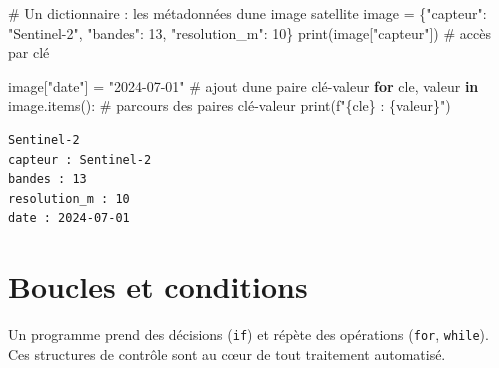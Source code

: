 \documentclass[
  french,
  11pt,
  letterpaper,
  open=any,
  twoside=false,
  french]{scrbook}
\newenvironment{Shaded}{\begin{snugshade}}{\end{snugshade}}
\newcommand{\BuiltInTok}[1]{\textcolor[rgb]{0.00,0.23,0.31}{#1}}
\newcommand{\CommentTok}[1]{\textcolor[rgb]{0.37,0.37,0.37}{#1}}
\newcommand{\ControlFlowTok}[1]{\textcolor[rgb]{0.00,0.23,0.31}{\textbf{#1}}}
\newcommand{\DecValTok}[1]{\textcolor[rgb]{0.68,0.00,0.00}{#1}}
\newcommand{\KeywordTok}[1]{\textcolor[rgb]{0.00,0.23,0.31}{\textbf{#1}}}
\newcommand{\NormalTok}[1]{\textcolor[rgb]{0.00,0.23,0.31}{#1}}
\newcommand{\OperatorTok}[1]{\textcolor[rgb]{0.37,0.37,0.37}{#1}}
\newcommand{\SpecialCharTok}[1]{\textcolor[rgb]{0.37,0.37,0.37}{#1}}
\newcommand{\SpecialStringTok}[1]{\textcolor[rgb]{0.13,0.47,0.30}{#1}}
\newcommand{\StringTok}[1]{\textcolor[rgb]{0.13,0.47,0.30}{#1}}
\begin{document}
\begin{Shaded}
\begin{Highlighting}[]
\CommentTok{\# Un dictionnaire : les métadonnées d\textquotesingle{}une image satellite}
\NormalTok{image }\OperatorTok{=}\NormalTok{ \{}\StringTok{"capteur"}\NormalTok{: }\StringTok{"Sentinel{-}2"}\NormalTok{, }\StringTok{"bandes"}\NormalTok{: }\DecValTok{13}\NormalTok{, }\StringTok{"resolution\_m"}\NormalTok{: }\DecValTok{10}\NormalTok{\}}
\BuiltInTok{print}\NormalTok{(image[}\StringTok{"capteur"}\NormalTok{])              }\CommentTok{\# accès par clé}

\NormalTok{image[}\StringTok{"date"}\NormalTok{] }\OperatorTok{=} \StringTok{"2024{-}07{-}01"}         \CommentTok{\# ajout d\textquotesingle{}une paire clé{-}valeur}
\ControlFlowTok{for}\NormalTok{ cle, valeur }\KeywordTok{in}\NormalTok{ image.items():    }\CommentTok{\# parcours des paires clé{-}valeur}
    \BuiltInTok{print}\NormalTok{(}\SpecialStringTok{f"}\SpecialCharTok{\{}\NormalTok{cle}\SpecialCharTok{\}}\SpecialStringTok{ : }\SpecialCharTok{\{}\NormalTok{valeur}\SpecialCharTok{\}}\SpecialStringTok{"}\NormalTok{)}
\end{Highlighting}
\end{Shaded}

\begin{verbatim}
Sentinel-2
capteur : Sentinel-2
bandes : 13
resolution_m : 10
date : 2024-07-01
\end{verbatim}

\section{Boucles et conditions}\label{boucles-et-conditions}

Un programme prend des décisions (\texttt{if}) et répète des opérations
(\texttt{for}, \texttt{while}). Ces structures de contrôle sont au cœur
de tout traitement automatisé.
\end{document}
